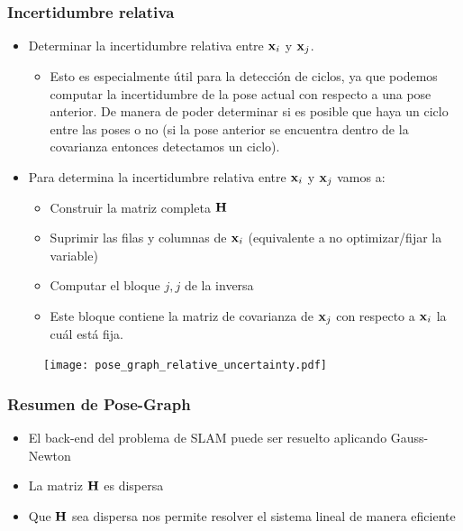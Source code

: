 \begin{frame}
    \frametitle{Incertidumbre relativa}
    \begin{itemize}
        \item Determinar la incertidumbre relativa entre $\boldsymbol{\mathbf{x}}_{i}$ y $\boldsymbol{\mathbf{x}}_{j}$.
        
        \begin{itemize}
            \item Esto es especialmente útil para la detección de ciclos, ya que podemos computar la incertidumbre de la pose actual con respecto a una pose anterior. De manera de poder determinar si es posible que haya un ciclo entre las poses o no (si la pose anterior se encuentra dentro de la covarianza entonces detectamos un ciclo).
        \end{itemize}
        

        
        \item Para determina la incertidumbre relativa entre $\boldsymbol{\mathbf{x}}_{i}$ y $\boldsymbol{\mathbf{x}}_{j}$ vamos a:    
        \begin{itemize}
            \item Construir la matriz completa $\boldsymbol{\mathbf{H}}$
            \item Suprimir las filas y columnas de $\boldsymbol{\mathbf{x}}_{i}$ (equivalente a no optimizar/fijar la variable)
            \item Computar el bloque $j,j$ de la inversa
            \item Este bloque contiene la matriz de covarianza de $\boldsymbol{\mathbf{x}}_{j}$ con respecto a $\boldsymbol{\mathbf{x}}_{i}$ la cuál está fija.
        \end{itemize}
    \end{itemize}

    \begin{figure}[!h]
        \texttt{[image: pose\_graph\_relative\_uncertainty.pdf]}
    \end{figure}
    
\end{frame}

\begin{frame}
    \frametitle{Resumen de Pose-Graph}
    
    \begin{itemize}
        \item El back-end del problema de SLAM puede ser resuelto aplicando Gauss-Newton
        \item La matriz $\boldsymbol{\mathbf{H}}$ es dispersa
        \item Que $\boldsymbol{\mathbf{H}}$ sea dispersa nos permite resolver el sistema lineal de manera eficiente
    \end{itemize}
    
\end{frame}

